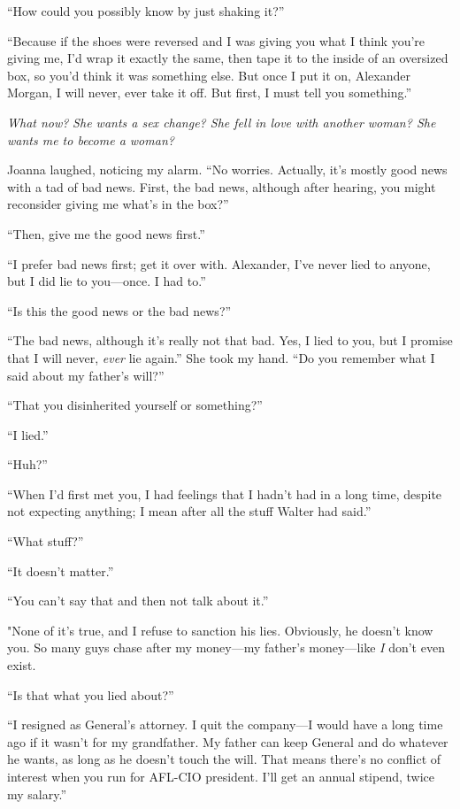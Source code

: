 ``How could you possibly know by just shaking it?''

``Because if the shoes were reversed and I was giving you what I think
you're giving me, I'd wrap it exactly the same, then tape it to the
inside of an oversized box, so you'd think it was something else. But
once I put it on, Alexander Morgan, I will never, ever take it off. But
first, I must tell you something.''

\emph{What now?} \emph{She wants a sex change? She fell in love with
another woman? She wants me to become a woman?}

Joanna laughed, noticing my alarm. ``No worries. Actually, it's mostly
good news with a tad of bad news. First, the bad news, although after
hearing, you might reconsider giving me what's in the box?''

``Then, give me the good news first.''

``I prefer bad news first; get it over with. Alexander, I've never lied
to anyone, but I did lie to you---once. I had to.''

``Is this the good news or the bad news?''

``The bad news, although it's really not that bad. Yes, I lied to you,
but I promise that I will never, \emph{ever} lie again.'' She took my
hand. ``Do you remember what I said about my father's will?''

``That you disinherited yourself or something?''

``I lied.''

``Huh?''

``When I'd first met you, I had feelings that I hadn't had in a long
time, despite not expecting anything; I mean after all the stuff Walter
had said.''

``What stuff?''

``It doesn't matter.''

``You can't say that and then not talk about it.''

"None of it's true, and I refuse to sanction his lies. Obviously, he
doesn't know you. So many guys chase after my money---my father's
money---like \emph{I} don't even exist.

``Is that what you lied about?''

``I resigned as General's attorney. I quit the company---I would have a
long time ago if it wasn't for my grandfather. My father can keep
General and do whatever he wants, as long as he doesn't touch the will.
That means there's no conflict of interest when you run for AFL-CIO
president. I'll get an annual stipend, twice my salary.''

